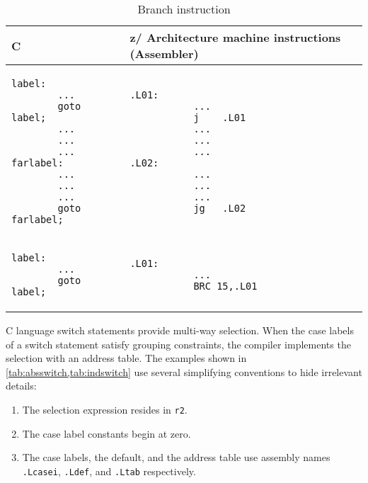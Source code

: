 \documentclass[english,11pt,twoside,toc=bib,toc=idx]{scrreprt}
\newcommand{\ARCH}{z/\kern-1pt Ar\-chi\-tec\-ture}
\newcommand{\ARCH}{ESA/390}
\newenvironment{DIFnomarkup}{}{} %
\begin{document}
\begin{table}
  \centering
  \begin{DIFnomarkup}
  \begin{tabular}{p{}p{}}
    \toprule
    C & \ARCH{} machine instructions (Assembler) \\
    \midrule
    \ifzseries
\begin{lstlisting}[style=short]
label:
        ...
        goto label;
        ...
        ...
        ...
farlabel:
        ...
        ...
        ...
        goto farlabel;
\end{lstlisting}
    &
\begin{lstlisting}[style=short,language=simpleasm]
.L01:
           ...
           j    .L01
           ...
           ...
           ...
.L02:
           ...
           ...
           ...
           jg   .L02
\end{lstlisting} \\
    \else
\begin{lstlisting}[style=short]
label:
        ...
        goto label;
\end{lstlisting}
    &
\begin{lstlisting}[style=short,language=simpleasm]
.L01:
           ...
           BRC 15,.L01
\end{lstlisting}
\fi \\
    \bottomrule
  \end{tabular}
  \end{DIFnomarkup}
  \caption{Branch instruction}
  \label{tab:branchinsn}
\end{table}

C language switch statements provide multi-way selection.  When the case
labels of a switch statement satisfy grouping constraints, the compiler
implements the selection with an address table.  The examples shown in
\cref{tab:absswitch,tab:indswitch} use several simplifying conventions to
hide irrelevant details:
\begin{enumerate}
\item The selection expression resides in \texttt{r2}.
\item The case label constants begin at zero.
\item The case labels, the default, and the address table use assembly
  names \texttt{.Lcasei}, \texttt{.Ldef}, and \texttt{.Ltab} respectively.
\end{enumerate}
\end{document}
